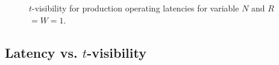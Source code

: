 \documentclass{vldb}
\begin{document}
\begin{figure}
\centering
{}
\vspace{-14pt}
\caption{$t$-visibility for production operating latencies for variable $N$ and $R$$=$$W$$=$$1$.}
\vspace{-2pt}
\label{fig:varyn}
\end{figure}

\subsection{Latency vs. $t$-visibility}
\end{document}
